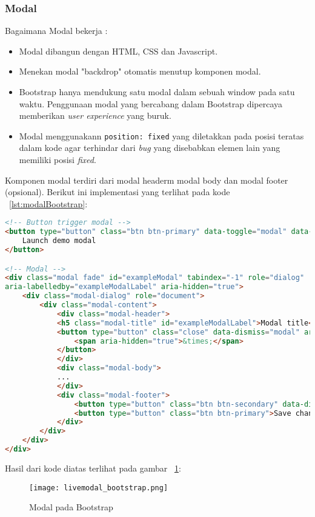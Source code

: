 \subsubsection{Modal}
Bagaimana Modal bekerja :
\begin{itemize}
	\item Modal dibangun dengan HTML, CSS dan Javascript. 
	\item Menekan modal "backdrop" otomatis menutup komponen modal.
	\item Bootstrap hanya mendukung satu modal dalam sebuah window pada satu waktu. Penggunaan modal yang bercabang dalam Bootstrap dipercaya memberikan \textit{user experience} yang buruk.
	\item Modal menggunakann \texttt{position: fixed} yang diletakkan pada posisi teratas dalam kode agar terhindar dari \textit{bug} yang disebabkan elemen lain yang memiliki posisi \textit{fixed}. 
\end{itemize}
Komponen modal terdiri dari modal headerm modal body dan modal footer (opsional). Berikut ini implementasi yang terlihat pada kode ~\ref{lst:modalBootstrap}:

\begin{lstlisting}[style=customhtml, language=HTML,  basicstyle=\ttfamily, frame=single, columns=fullflexible, keepspaces=true, breaklines=true, showstringspaces=false, label={lst:modalBootstrap}, caption=Modal bar pada bootstrap 4.] 
<!-- Button trigger modal -->
<button type="button" class="btn btn-primary" data-toggle="modal" data-target="#myModal">
	Launch demo modal
</button>

<!-- Modal -->
<div class="modal fade" id="exampleModal" tabindex="-1" role="dialog" 
aria-labelledby="exampleModalLabel" aria-hidden="true">
	<div class="modal-dialog" role="document">
		<div class="modal-content">
			<div class="modal-header">
			<h5 class="modal-title" id="exampleModalLabel">Modal title</h5>
			<button type="button" class="close" data-dismiss="modal" aria-label="Close">
				<span aria-hidden="true">&times;</span>
			</button>
			</div>
			<div class="modal-body">
			...
			</div>
			<div class="modal-footer">
				<button type="button" class="btn btn-secondary" data-dismiss="modal">Close</button>
				<button type="button" class="btn btn-primary">Save changes</button>
			</div>
		</div>
	</div>
</div>
\end{lstlisting}

\noindent Hasil dari kode diatas terlihat pada gambar ~\ref{fig:modalBootstrap}:
\begin{figure} [H]
	\centering  
	\texttt{[image: livemodal\_bootstrap.png]}  
	\caption{Modal pada Bootstrap} 
	\label{fig:modalBootstrap}
\end{figure}

